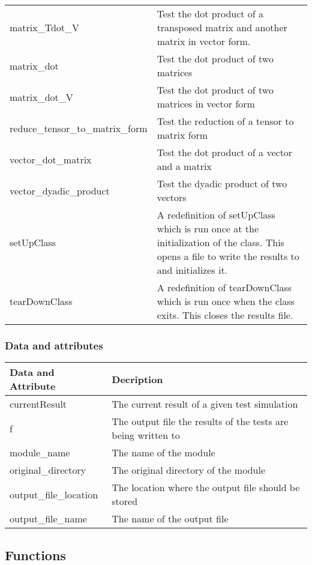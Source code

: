 \documentclass{asme2ej}
\begin{document}
\begin{longtable}{ p{}  p{} }
matrix\_Tdot\_V & Test the dot product of a transposed matrix and another matrix in vector form.\\
matrix\_dot & Test the dot product of two matrices\\
matrix\_dot\_V & Test the dot product of two matrices in vector form\\
reduce\_tensor\_to\_matrix\_form & Test the reduction of a tensor to matrix form\\
vector\_dot\_matrix & Test the dot product of a vector and a matrix\\
vector\_dyadic\_product & Test the dyadic product of two vectors\\
setUpClass & A redefinition of setUpClass which is run once at the initialization of the class. This opens a file to write the results to and initializes it.\\
tearDownClass & A redefinition of tearDownClass which is run once when the class exits. This closes the results file.\\
\hline
\end{longtable}

\subsubsection{Data and attributes}
\begin{longtable}{ p{}  p{} }
\hline
Data and Attribute & Decription\\
\hline
\hline
currentResult & The current result of a given test simulation\\
f & The output file the results of the tests are being written to\\
module\_name & The name of the module\\
original\_directory & The original directory of the module\\
output\_file\_location & The location where the output file should be stored\\
output\_file\_name & The name of the output file\\
\hline
\end{longtable}

\subsection{Functions}
\end{document}
